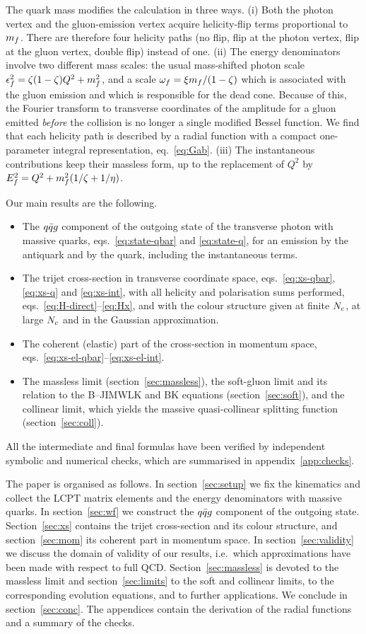 The quark mass modifies the calculation in three ways. (i) Both the photon vertex and the gluon-emission
vertex acquire helicity-flip terms proportional to $m_f$. There are therefore four helicity paths
(no flip, flip at the photon vertex, flip at the gluon vertex, double flip) instead of one. (ii) The
energy denominators involve two different mass scales: the usual mass-shifted photon scale
$\epsilon_f^2=\zeta(1-\zeta)Q^2+m_f^2$, and a scale $\omega_f=\xi m_f/(1-\zeta)$ which is associated with the gluon
emission and which is responsible for the dead cone. Because of this, the Fourier transform to
transverse coordinates of the amplitude for a gluon emitted \emph{before} the collision is no longer a
single modified Bessel function. We find that each helicity path is described by a radial function with
a compact one-parameter integral representation, eq.~\eqref{eq:Gab}. (iii) The instantaneous
contributions keep their massless form, up to the replacement of $Q^2$ by
$E_f^2=Q^2+m_f^2(1/\zeta+1/\eta)$.

Our main results are the following.
\begin{itemize}
\item The $q\bar q g$ component of the outgoing state of the transverse photon with massive quarks,
eqs.~\eqref{eq:state-qbar} and \eqref{eq:state-q}, for an emission by the antiquark and by the quark,
including the instantaneous terms.
\item The trijet cross-section in transverse coordinate space, eqs.~\eqref{eq:xs-qbar},
\eqref{eq:xs-q} and \eqref{eq:xs-int}, with all helicity and polarisation sums performed,
eqs.~\eqref{eq:H-direct}--\eqref{eq:Hx}, and with the colour structure given at finite $N_c$, at large
$N_c$ and in the Gaussian approximation.
\item The coherent (elastic) part of the cross-section in momentum space,
eqs.~\eqref{eq:xs-el-qbar}--\eqref{eq:xs-el-int}.
\item The massless limit (section~\ref{sec:massless}), the soft-gluon limit and its relation to the
B--JIMWLK and BK equations (section~\ref{sec:soft}), and the collinear limit, which yields the massive
quasi-collinear splitting function (section~\ref{sec:coll}).
\end{itemize}
All the intermediate and final formulas have been verified by independent symbolic and numerical checks,
which are summarised in appendix~\ref{app:checks}.

The paper is organised as follows. In section~\ref{sec:setup} we fix the kinematics and collect the
LCPT matrix elements and the energy denominators with massive quarks. In section~\ref{sec:wf} we
construct the $q\bar q g$ component of the outgoing state. Section~\ref{sec:xs} contains the trijet
cross-section and its colour structure, and section~\ref{sec:mom} its coherent part in momentum space.
In section~\ref{sec:validity} we discuss the domain of validity of our results, i.e.\ which
approximations have been made with respect to full QCD. Section~\ref{sec:massless} is devoted to the
massless limit and section~\ref{sec:limits} to the soft and collinear limits, to the corresponding
evolution equations, and to further applications. We conclude in section~\ref{sec:conc}. The appendices
contain the derivation of the radial functions and a summary of the checks.
